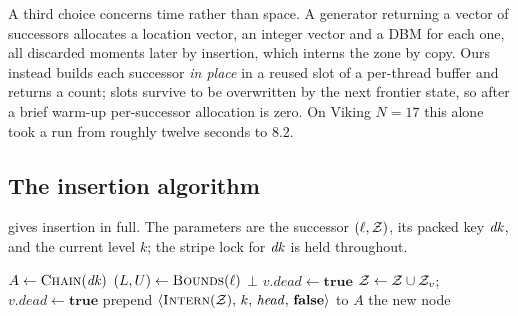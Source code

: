 A third choice concerns time rather than space. A generator returning a vector of successors
allocates a location vector, an integer vector and a DBM for each one, all discarded moments
later by insertion, which interns the zone by copy. Ours instead builds each successor
\emph{in place} in a reused slot of a per-thread buffer and returns a count; slots survive to
be overwritten by the next frontier state, so after a brief warm-up per-successor allocation
is zero. On Viking $N{=}17$ this alone took a run from roughly twelve seconds to $8.2$.

\subsection{The insertion algorithm}

 gives insertion in full. The parameters are the successor $(\ell,\mathcal{Z})$,
its packed key $\dk$, and the current level $k$; the stripe lock for $\dk$ is held throughout.

\begin{algorithm}[t]
\caption{$\textsc{Insert}(\ell, \Zone, \dk, k)$ --- executed under the stripe lock of $\dk$}
\label{alg:insert}
\begin{algorithmic}[1]
\State $A \gets \textsc{Chain}(\mathit{dk})$ 
\State $(L,U) \gets \textsc{Bounds}(\ell)$ \label{ln:bounds}
 \label{ln:sub1}
   \State \Return $\bot$ \label{ln:drop}
  \EndIf
\EndFor
{} \label{ln:sub2}
   \State $v.\mathit{dead} \gets \mathbf{true}$ 
  \EndIf
\EndFor
{} \label{ln:union}
  \State $\mathcal{Z} \gets \mathcal{Z} \cup \mathcal{Z}_v$; \quad $v.\mathit{dead} \gets \mathbf{true}$
\EndWhile
\State prepend $\langle \textsc{Intern}(\mathcal{Z}),\, k,\, \mathit{head},\, \mathbf{false}\rangle$ to $A$ \label{ln:push}
\State \Return the new node
\end{algorithmic}
\end{algorithm}

